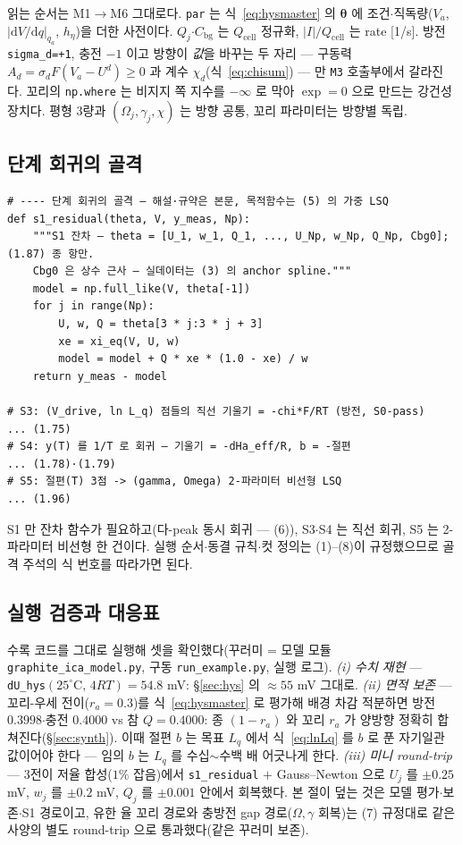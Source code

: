 \documentclass[11pt,a4paper]{article}
\newcommand{\dd}{\mathrm{d}}
\newcommand{\cell}{\mathrm{cell}}
\newcommand{\bg}{\mathrm{bg}}
\begin{document}
읽는 순서는 M1$\to$M6 그대로다. \texttt{par} 는 식~\eqref{eq:hysmaster} 의 $\bm\theta$ 에 조건$\cdot$직독량($V_a$, $|\dd V/\dd q|_{q_a}$, $h_\eta$)을 더한 사전이다. $Q_j$$\cdot$$C_\bg$ 는 $Q_\cell$ 정규화, $|I|/Q_\cell$ 는 rate [1/s]. 방전 \texttt{sigma\_d=+1}, 충전 $-1$ 이고 방향이 \emph{값}을 바꾸는 두 자리 — 구동력 $A_d=\sigma_dF(V_a-U^d)\ge0$ 과 계수 $\chi_d$(식~\eqref{eq:chisum}) — 만 \texttt{M3} 호출부에서 갈라진다. 꼬리의 \texttt{np.where} 는 비지지 쪽 지수를 $-\infty$ 로 막아 $\exp=0$ 으로 만드는 강건성 장치다. 평형 3량과 $(\Omega_j,\gamma_j,\chi)$ 는 방향 공통, 꼬리 파라미터는 방향별 독립.

\subsection{단계 회귀의 골격}\label{sec:codestage}
\begin{small}
\begin{verbatim}
# ---- 단계 회귀의 골격 — 해설·규약은 본문, 목적함수는 (5) 의 가중 LSQ
def s1_residual(theta, V, y_meas, Np):
    """S1 잔차 — theta = [U_1, w_1, Q_1, ..., U_Np, w_Np, Q_Np, Cbg0]; (1.87) 종 항만.
    Cbg0 은 상수 근사 — 실데이터는 (3) 의 anchor spline."""
    model = np.full_like(V, theta[-1])
    for j in range(Np):
        U, w, Q = theta[3 * j:3 * j + 3]
        xe = xi_eq(V, U, w)
        model = model + Q * xe * (1.0 - xe) / w
    return y_meas - model

# S3: (V_drive, ln L_q) 점들의 직선 기울기 = -chi*F/RT (방전, S0-pass)      ... (1.75)
# S4: y(T) 를 1/T 로 회귀 — 기울기 = -dHa_eff/R, b = -절편                  ... (1.78)·(1.79)
# S5: 절편(T) 3점 -> (gamma, Omega) 2-파라미터 비선형 LSQ                   ... (1.96)
\end{verbatim}
\end{small}
S1 만 잔차 함수가 필요하고(다-peak 동시 회귀 — (6)), S3$\cdot$S4 는 직선 회귀, S5 는 2-파라미터 비선형 한 건이다. 실행 순서$\cdot$동결 규칙$\cdot$컷 정의는 (1)--(8)이 규정했으므로 골격 주석의 식 번호를 따라가면 된다.

\subsection{실행 검증과 대응표}\label{sec:codeverify}
수록 코드를 그대로 실행해 셋을 확인했다(꾸러미 = 모델 모듈 \texttt{graphite\_ica\_model.py}, 구동 \texttt{run\_example.py}, 실행 로그).
\emph{(i) 수치 재현} — \texttt{dU\_hys}$(25^\circ\mathrm C,\,4RT)=54.8$ mV: \S\ref{sec:hys} 의 $\approx55$ mV 그대로.
\emph{(ii) 면적 보존} — 꼬리-우세 전이($r_a=0.3$)를 식~\eqref{eq:hysmaster} 로 평가해 배경 차감 적분하면 방전 $0.3998$$\cdot$충전 $0.4000$ vs 참 $Q=0.4000$: 종 $(1-r_a)$ 와 꼬리 $r_a$ 가 양방향 정확히 합쳐진다(\S\ref{sec:synth}). 이때 절편 $b$ 는 목표 $L_q$ 에서 식~\eqref{eq:lnLq} 를 $b$ 로 푼 자기일관 값이어야 한다 — 임의 $b$ 는 $L_q$ 를 수십$\sim$수백 배 어긋나게 한다.
\emph{(iii) 미니 round-trip} — 3전이 저율 합성($1\%$ 잡음)에서 \texttt{s1\_residual} $+$ Gauss--Newton 으로 $U_j$ 를 $\pm0.25$ mV, $w_j$ 를 $\pm0.2$ mV, $Q_j$ 를 $\pm0.001$ 안에서 회복했다. 본 절이 덮는 것은 모델 평가$\cdot$보존$\cdot$S1 경로이고, 유한 율 꼬리 경로와 충방전 gap 경로($\Omega,\gamma$ 회복)는 (7) 규정대로 같은 사양의 별도 round-trip 으로 통과했다(같은 꾸러미 보존).
\end{document}
